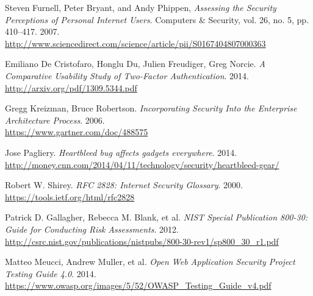 \documentclass[a4paper,12pt]{article}
\begin{document}
\begin{thebibliography}{}
		Steven Furnell, Peter Bryant, and Andy Phippen, \textit{Assessing the Security Perceptions of Personal Internet Users}. Computers \& Security, vol. 26, no. 5, pp. 410–417. 2007.\\
		\url{http://www.sciencedirect.com/science/article/pii/S0167404807000363}
		
		Emiliano De Cristofaro, Honglu Du, Julien Freudiger, Greg Norcie. \textit{A Comparative Usability Study of Two-Factor Authentication}. 2014.\\
		\url{http://arxiv.org/pdf/1309.5344.pdf}
		
		Gregg Kreizman, Bruce Robertson. \textit{Incorporating Security Into the Enterprise Architecture Process}. 2006.\\
		\url{https://www.gartner.com/doc/488575}
		
		Jose Pagliery. \textit{Heartbleed bug affects gadgets everywhere}. 2014.\\
		\url{http://money.cnn.com/2014/04/11/technology/security/heartbleed-gear/}
		
		Robert W. Shirey. \textit{RFC 2828: Internet Security Glossary}. 2000.\\
		\url{https://tools.ietf.org/html/rfc2828}
		
		Patrick D. Gallagher, Rebecca M. Blank, et al. \textit{NIST Special Publication 800-30: Guide for Conducting Risk Assessments}. 2012.\\
		\url{http://csrc.nist.gov/publications/nistpubs/800-30-rev1/sp800_30_r1.pdf}
		
		Matteo Meucci, Andrew Muller, et al. \textit{Open Web Application Security Project Testing Guide 4.0}. 2014.\\
		\url{https://www.owasp.org/images/5/52/OWASP_Testing_Guide_v4.pdf}
		
	\end{thebibliography}
	\endgroup
\end{document}

